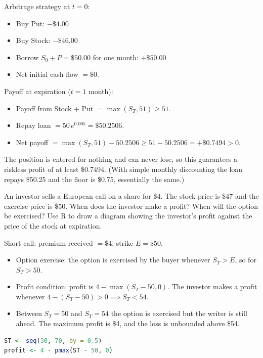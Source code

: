 \documentclass[answers]{exam}
\begin{document}
\begin{questions}
\begin{solution}
\begin{parts}
    Arbitrage strategy at $t = 0$:
    \begin{itemize}
        \item Buy Put: $-\$4.00$
        \item Buy Stock: $-\$46.00$
        \item Borrow $S_0 + P = \$50.00$ for one month: $+\$50.00$
        \item Net initial cash flow $= \$0$.
    \end{itemize}
    Payoff at expiration ($t = 1$ month):
    \begin{itemize}
        \item Payoff from Stock $+$ Put $= \max(S_T, 51) \ge 51$.
        \item Repay loan $= 50\,e^{0.005} = \$50.2506$.
        \item Net payoff $= \max(S_T, 51) - 50.2506 \ge 51 - 50.2506 = +\$0.7494 > 0$.
    \end{itemize}
    The position is entered for nothing and can never lose, so this guarantees a riskless profit of at least \$0.7494. (With simple monthly discounting the loan repays \$50.25 and the floor is \$0.75, essentially the same.)
\end{parts}
\end{solution}

\question An investor sells a European call on a share for \$4. The stock price is \$47 and the exercise price is \$50. When does the investor make a profit? When will the option be exercised? Use R to draw a diagram showing the investor's profit against the price of the stock at expiration.

\begin{solution}
Short call: premium received $=\$4$, strike $E = \$50$.
\begin{itemize}
    \item Option exercise: the option is exercised by the buyer whenever $S_T > E$, so for $S_T > 50$.
    \item Profit condition: profit is $4 - \max(S_T - 50, 0)$. The investor makes a profit whenever $4 - (S_T - 50) > 0 \implies S_T < 54$.
    \item Between $S_T = 50$ and $S_T = 54$ the option is exercised but the writer is still ahead. The maximum profit is \$4, and the loss is unbounded above \$54.
\end{itemize}

\begin{lstlisting}[language=R]
ST <- seq(30, 70, by = 0.5)
profit <- 4 - pmax(ST - 50, 0)


\end{lstlisting}
\end{solution}
\end{questions}
\end{document}
